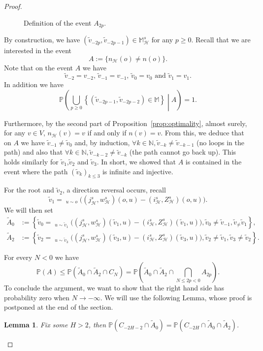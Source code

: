 \documentclass[10pt,a4paper]{amsart}
\newtheorem{lemma}{Lemma}
\DeclareMathOperator*{\argmax}{argmax}
\DeclareMathOperator*{\argmaxxlex}{\overset{[2],\lex}{\argmax}}
\DeclareMathOperator{\lex}{lex}
\begin{document}
\begin{proof}
\begin{figure}
    \centering
    
    \caption{Definition of the event $A_{2p}$.}
    \label{fig:uniquenessevent}
\end{figure}

By construction, we have $(\tilde{v}_{-2p},\tilde{v}_{-2p-1})\in \mathbb{M}^s_{\mathcal{H}}$ for any $p\geq0$. Recall that we are interested in the event
\begin{equation}
    A := \{n_{\mathcal{H}}(o)\neq n(o)\}.
\end{equation}
Note that on the event $A$ we have
\[
\tilde{v}_{-2} = v_{-2}, \, \tilde{v}_{-1} = v_{-1}, \,\tilde{v}_{0} = v_0 \text{ and } \tilde{v}_1 = v_1.
\]
In addition we have
\[\mathbb{P}\left(\bigcup_{p \geq 0}\left\{ (\tilde{v}_{-2p-1},\tilde{v}_{-2p-2})\in \mathbb{M}\right\} \middle| A \right)=1. \]

Furthermore, by the second part of Proposition~\ref{prop:optimality}, almost surely, for any $v\in V$, $n_{\mathcal{H}}(v)=v$ if and only if $n(v)=v$. From this, we deduce that on $A$ we have $\tilde{v}_{-1}\neq \tilde{v}_0$ and, by induction, $  \forall k \in \mathbb{N}, \tilde{v}_{-k} \neq \tilde{v}_{-k-1}$ (no loops in the path) and also that $\forall k \in \mathbb{N}, \tilde{v}_{-k-2} \neq \tilde{v}_{-k}$ (the path cannot go back up). This holds similarly for $\tilde{v}_1$,$\tilde{v}_2$ and $\tilde{v}_3$. In short, we showed that $A$ is contained in the event where the path $(\tilde{v}_k)_{k\leq 3}$ is infinite and injective.



For the root and $\tilde{v}_2$, a direction reversal occurs, recall
\[ \tilde{v}_1=\argmaxxlex_{u \sim o} \bigg( (j_{\mathcal{H}}^s,w_{\mathcal{H}}^s)(o,u)- (i_{\mathcal{H}}^s,Z_{\mathcal{H}}^s)(o,u)\bigg)
.  \]
We will then set
\begin{align}
\tilde{A}_0 &:= \left\{ \tilde{v}_0=\argmaxxlex_{u \sim \tilde{v}_1} \bigg( (j_{\mathcal{H}}^s,w_{\mathcal{H}}^s)(\tilde{v}_1,u)- (i_{\mathcal{H}}^s,Z_{\mathcal{H}}^s)(\tilde{v}_1,u)\bigg), \tilde{v}_0\neq \tilde{v}_{-1}, \tilde{v}_ \neq \tilde{v}_1 
\right\} , \\
\tilde{A}_2 &:=\left\{ \tilde{v}_2=\argmaxxlex_{u \sim \tilde{v}_3} \bigg( (j_{\mathcal{H}}^s,w_{\mathcal{H}}^s)(\tilde{v}_3,u)- (i_{\mathcal{H}}^s,Z_{\mathcal{H}}^s)(\tilde{v}_3,u)\bigg) , \tilde{v}_2\neq \tilde{v}_1, \tilde{v}_3 \neq \tilde{v}_2 \right\} .
\end{align}

For every $N <0$ we have
\[ \mathbb{P}(A) \leq \mathbb{P}(\tilde A_0\cap \tilde A_2 \cap C_N) = \mathbb{P}\left( \tilde A_0 \cap \tilde A_2 \cap \bigcap_{N\leq 2p < 0} A_{2p} \right)  . \]
To conclude the argument, we want to show that the right hand side has probability zero when $N \rightarrow -\infty$. We will use the following Lemma, whose proof is postponed at the end of the section.
\begin{lemma}\label{lem:doublyinfinitepath}
Fix some $H>2$, then $\mathbb{P}(C_{-2H-2}\cap \tilde{A}_0)=\mathbb{P}(C_{-2H} \cap \tilde{A}_0 \cap \tilde{A}_2)$.
\end{lemma}


\end{proof}
\end{document}

